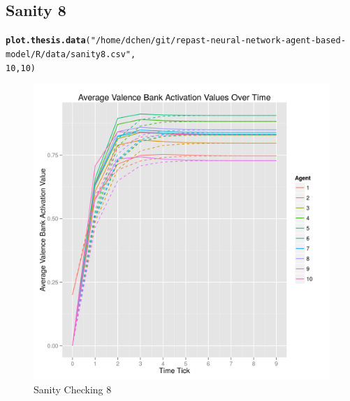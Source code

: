 \documentclass{article}\usepackage[]{graphicx}\usepackage[]{color}
\makeatletter
\def\maxwidth{ %
  \ifdim\Gin@nat@width>\linewidth
    \linewidth
  \else
    \Gin@nat@width
  \fi
}
\newcommand{\hlnum}[1]{\textcolor[rgb]{0.686,0.059,0.569}{#1}}%
\newcommand{\hlstr}[1]{\textcolor[rgb]{0.192,0.494,0.8}{#1}}%
\newcommand{\hlstd}[1]{\textcolor[rgb]{0.345,0.345,0.345}{#1}}%
\newcommand{\hlkwd}[1]{\textcolor[rgb]{0.737,0.353,0.396}{\textbf{#1}}}%
\newenvironment{kframe}{%
 \def\at@end@of@kframe{}%
 \ifinner\ifhmode%
  \def\at@end@of@kframe{\end{minipage}}%
  \begin{minipage}{\columnwidth}%
 \fi\fi%
 \def\FrameCommand##1{\hskip\@totalleftmargin \hskip-\fboxsep
 \colorbox{shadecolor}{##1}\hskip-\fboxsep
     \hskip-\linewidth \hskip-\@totalleftmargin \hskip\columnwidth}%
 \MakeFramed {\advance\hsize-\width
   \@totalleftmargin\z@ \linewidth\hsize
   \@setminipage}}%
 {\par\unskip\endMakeFramed%
 \at@end@of@kframe}
\newenvironment{knitrout}{}{} %
\makeatother
\begin{document}
\subsection{Sanity 8}
\begin{knitrout}
\color{fgcolor}\begin{kframe}
\begin{alltt}
\hlkwd{plot.thesis.data}\hlstd{(}\hlstr{"/home/dchen/git/repast-neural-network-agent-based-model/R/data/sanity8.csv"}\hlstd{,}
    \hlnum{10}\hlstd{,} \hlnum{10}\hlstd{)}
\end{alltt}
\end{kframe}\begin{figure}[]

\includegraphics[width=\maxwidth]{figure/plot-sanity-8} \caption[Sanity Checking 8]{Sanity Checking 8\label{fig:plot-sanity-8}}
\end{figure}


\end{knitrout}


\newpage
\end{document}
